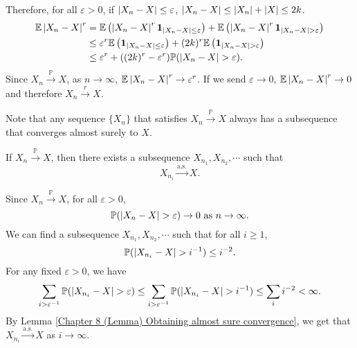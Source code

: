 \documentclass{huhtakm-template-book-v2}
\newcommand{\prob}{\mathbb{P}}
\newcommand{\expect}{\mathbb{E}}
\begin{document}
\begin{proofing}
\begin{enumerate}
            Therefore, for all $\varepsilon > 0$, if $\left|{X_{n}-X}\right| \leq \varepsilon$, $\left|{X_{n}-X}\right| \leq \left|{X_{n}}\right|+\left|{X}\right| \leq 2k$.
            \begin{align*}
                \expect\abs{X_{n}-X}^{r} &= \expect\left(\abs{X_{n}-X}^{r}\mathbf{1}_{\abs{X_{n}-X} \leq \varepsilon}\right)+\expect\left(\abs{X_{n}-X}^{r}\mathbf{1}_{\abs{X_{n}-X} > \varepsilon}\right)\\
                &\leq \varepsilon^{r}\expect\left(\mathbf{1}_{\abs{X_{n}-X} \leq \varepsilon}\right)+(2k)^{r}\expect\left(\mathbf{1}_{\abs{X_{n}-X} > \varepsilon}\right)\\
                &\leq \varepsilon^{r}+((2k)^{r}-\varepsilon^{r})\prob(\abs{X_{n}-X} > \varepsilon).
            \end{align*}
            Since $X_{n} \xrightarrow{\prob} X$, as $n \to \infty$, $\expect\abs{X_{n}-X}^{r} \to \varepsilon^{r}$. If we send $\varepsilon \to 0$, $\expect\abs{X_{n}-X}^{r} \to 0$ and therefore $X_{n} \xrightarrow{r} X$.
        \end{enumerate}
    \end{proofing}
    Note that any sequence $\{X_{n}\}$ that satisfies $X_{n} \xrightarrow{\prob} X$ always has a subsequence that converges almost surely to $X$.
    \begin{thm}
        \label{Chapter 8 (Theorem) Probability convergence implies almost sure convergence for a subsequence}
        If $X_{n} \xrightarrow{\prob} X$, then there exists a subsequence $X_{n_{1}},X_{n_{2}},\cdots$ such that
        \begin{equation*}
            X_{n_{i}} \xrightarrow{\text{a.s.}} X.
        \end{equation*}
    \end{thm}
    \begin{proofing}
        Since $X_{n} \xrightarrow{\prob} X$, for all $\varepsilon > 0$,
        \begin{equation*}
            \prob(\abs{X_{n}-X} > \varepsilon) \to 0 \text{ as } n \to \infty.
        \end{equation*}
        We can find a subsequence $X_{n_{1}},X_{n_{2}},\cdots$ such that for all $i \geq 1$,
        \begin{equation*}
            \prob(\abs{X_{n_{i}}-X} > i^{-1}) \leq i^{-2}.
        \end{equation*}
        For any fixed $\varepsilon > 0$, we have
        \begin{equation*}
            \sum_{i > \varepsilon^{-1}}\prob(\abs{X_{n_{i}}-X} > \varepsilon) \leq \sum_{i > \varepsilon^{-1}}\prob(\abs{X_{n_{i}}-X} > i^{-1}) \leq \sum_{i}i^{-2} < \infty.
        \end{equation*}
        By Lemma \ref{Chapter 8 (Lemma) Obtaining almost sure convergence}, we get that $X_{n_{i}} \xrightarrow{\text{a.s.}} X$ as $i \to \infty$.
    \end{proofing}
    \newpage
\end{document}
